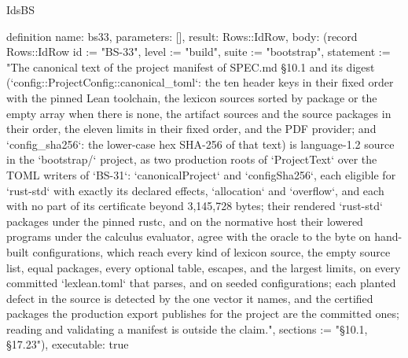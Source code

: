 \begin{lexlean}{IdsBS}
\begin{semanticmodule}
definition{
  name: bs33,
  parameters: [],
  result: Rows::IdRow,
  body: (record Rows::IdRow {id := "BS-33", level := "build", suite := "bootstrap", statement := "The canonical text of the project manifest of SPEC.md §10.1 and its digest (`config::ProjectConfig::canonical_toml`: the ten header keys in their fixed order with the pinned Lean toolchain, the lexicon sources sorted by package or the empty array when there is none, the artifact sources and the source packages in their order, the eleven limits in their fixed order, and the PDF provider; and `config_sha256`: the lower-case hex SHA-256 of that text) is language-1.2 source in the `bootstrap/` project, as two production roots of `ProjectText` over the TOML writers of `BS-31`: `canonicalProject` and `configSha256`, each eligible for `rust-std` with exactly its declared effects, `allocation` and `overflow`, and each with no part of its certificate beyond 3,145,728 bytes; their rendered `rust-std` packages under the pinned rustc, and on the normative host their lowered programs under the calculus evaluator, agree with the oracle to the byte on hand-built configurations, which reach every kind of lexicon source, the empty source list, equal packages, every optional table, escapes, and the largest limits, on every committed `lexlean.toml` that parses, and on seeded configurations; each planted defect in the source is detected by the one vector it names, and the certified packages the production export publishes for the project are the committed ones; reading and validating a manifest is outside the claim.", sections := "§10.1, §17.23"}),
  executable: true
}


\end{semanticmodule}
\end{lexlean}
